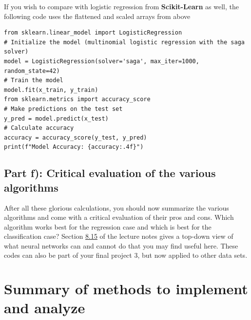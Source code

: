 \documentclass[11pt,a4paper]{article}
\begin{document}
If you wish to compare with logistic regression from
\textbf{Scikit-Learn} as well, the following code uses the flattened and
scaled arrays from above
\begin{lstlisting}
from sklearn.linear_model import LogisticRegression
# Initialize the model (multinomial logistic regression with the saga solver)
model = LogisticRegression(solver='saga', max_iter=1000, random_state=42)
# Train the model
model.fit(x_train, y_train)
from sklearn.metrics import accuracy_score
# Make predictions on the test set
y_pred = model.predict(x_test)
# Calculate accuracy
accuracy = accuracy_score(y_test, y_pred)
print(f"Model Accuracy: {accuracy:.4f}")
\end{lstlisting}

\subsection*{Part f): Critical evaluation of the various algorithms}

After all these glorious calculations, you should now summarize the various
algorithms and come with a critical evaluation of their pros and cons.
Which algorithm works best for the regression case and which is best for
the classification case?  Section
\href{https://educationalmaterialuio.github.io/MachineLearningUiO/doc/LectureNotes/_build/html/chapter8.html#limitations-and-a-top-down-view}{8.15}
of the lecture notes gives a top-down view of what neural networks can and
cannot do that you may find useful here.  These codes can also be part of
your final project 3, but now applied to other data sets.

\section*{Summary of methods to implement and analyze}
\end{document}
